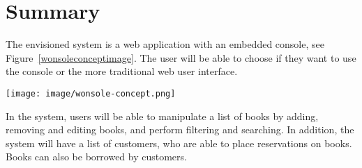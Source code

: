 \begin{comment}
  D13 & 1.5             & Order new books \\ \hline
  G1 & 3.5          & Save users' changes to server \\ \hline
  G2 & 2            & Save users' changes in real time \\ \hline
  G3 & 8            & See console and web UI simultaneously \\ \hline
  G4 & 4            & Synchronize console and web UI \\ \hline
  G5 & 3            & Tutorial \\ \hline
  G6 & 3            & Display available commands \\ \hline
  G7 & 2            & Repeat previous commands \\ \hline
  G8 & 3            & Batch commands \\ \hline
\end{tabular}
\caption{User story diffuculty}
\label{table:userstory-difficulty}
\end{table}
\end{comment}

\section{Summary}

The envisioned system is a web application with an embedded console, see Figure~\ref{wonsoleconceptimage}. The user will be able to choose if they want to use the console or the more traditional web user interface.

\begin{center}
\texttt{[image: image/wonsole-concept.png]}
\label{wonsoleconceptimage}%
\end{center}

In the system, users will be able to manipulate a list of books by adding, removing and editing books, and perform filtering and searching. In addition, the system will have a list of customers, who are able to place reservations on books. Books can also be borrowed by customers.
